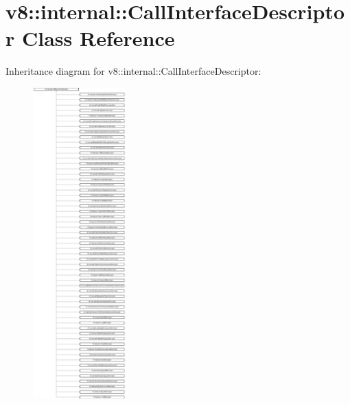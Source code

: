 \hypertarget{classv8_1_1internal_1_1_call_interface_descriptor}{}\section{v8\+:\+:internal\+:\+:Call\+Interface\+Descriptor Class Reference}
\label{classv8_1_1internal_1_1_call_interface_descriptor}
Inheritance diagram for v8\+:\+:internal\+:\+:Call\+Interface\+Descriptor\+:\begin{figure}[H]
\begin{center}
\leavevmode
\includegraphics[height=12.000000cm]{classv8_1_1internal_1_1_call_interface_descriptor}
\end{center}
\end{figure}
